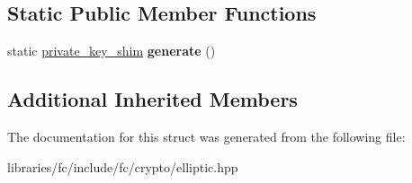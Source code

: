 \subsection*{Static Public Member Functions}
\begin{DoxyCompactItemize}
\item 
\mbox{\label{structfc_1_1ecc_1_1private__key__shim_acb914d43c25b8b1d14a9d05082142589}} 
static \mbox{\hyperlink{structfc_1_1ecc_1_1private__key__shim}{private\+\_\+key\+\_\+shim}} {\bfseries generate} ()
\end{DoxyCompactItemize}
\subsection*{Additional Inherited Members}


The documentation for this struct was generated from the following file\+:\begin{DoxyCompactItemize}
\item 
libraries/fc/include/fc/crypto/elliptic.\+hpp\end{DoxyCompactItemize}
